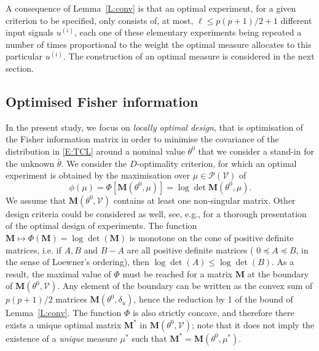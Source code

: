 \documentclass[twocolumn]{autart}
\newcommand{\Luc}{\color{magenta} }
\theoremstyle{definition}
\theoremstyle{remark}
\newcommand{\V}{\mathcal{V}}
\renewcommand{\P}{\mathcal{P}}
\newcommand{\Mb}{\mathbf{M}}
\begin{document}
A consequence of Lemma~\ref{L:conv} is that an optimal experiment, for a given criterion to be specified, only consists of, at most, $\ell\leq p(p+1)/2+1$ different input signals $u^{(i)}$, each one of these elementary experiments being repeated a number of times proportional to the weight the optimal measure allocates to this particular $u^{(i)}$. The construction of an optimal measure is considered in the next section. 

\subsection{Optimised Fisher information}

In the present study, we focus on \textit{locally optimal design}, that is optimisation of the Fisher information matrix in order to minimise the covariance of the distribution in \eqref{E:TCL} around a nominal value $\theta^0$ that we consider a stand-in for the unknown $\bar\theta$. We consider the $D$-optimality criterion, for which an optimal experiment is obtained by the maximisation over $\mu\in \P(\V)$ of
$$
\phi(\mu)=\Phi[\Mb(\theta^0,\mu)] = \log \det \Mb(\theta^0,\mu).
$$
{\Luc We assume that $\Mb(\theta^0,\V)$ contains at least one non-singular matrix. Other design criteria could be considered as well, see, e.g., \cite{Fedorov72,Silvey80,Pukelsheim2006} for a thorough presentation of the optimal design of experiments.}
The function $\Mb\mapsto \Phi(\Mb)=\log \det(\Mb)$ is monotone on the cone of positive definite matrices, i.e. if $A,B$ and $B-A$ are all positive definite matrices ({\Luc $0\preceq A\preceq B$, in the sense of Loewner's ordering}), then $\log \det(A)\leq \log \det (B)$. {\Luc As a result, the maximal value of $\Phi$ must be reached for a matrix $\Mb$ at the boundary of $\Mb(\theta^0,\V)$.
Any element of the boundary can be written as the convex sum of $p(p+1)/2$ matrices $\Mb(\theta^0, \delta_u)$, hence the reduction by 1 of the bound of Lemma~\ref{L:conv}. The function $\Phi$ is also strictly concave, and therefore there exists a unique optimal matrix $\Mb^*$ in $\Mb(\theta^0,\V)$; note that it does not imply the existence of a {\em unique} measure $\mu^*$ such that $\Mb^*=\Mb(\theta^0,\mu^*)$.}
\end{document}
